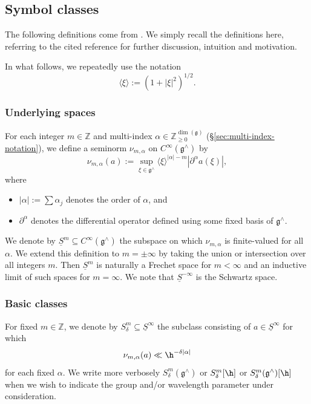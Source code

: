 \subsection{Symbol classes}
The following definitions come from \cite[\S9]{2020arXiv201202187N}.  We simply recall the definitions here, referring to the cited reference for further discussion, intuition and motivation.

In what follows, we repeatedly use the notation
\begin{equation*}
  \langle \xi \rangle := (1 + |\xi|^2)^{1/2}.
\end{equation*}

\subsubsection{Underlying spaces}
For each integer $m \in \mathbb{Z}$ and multi-index $\alpha \in \mathbb{Z}_{\geq 0}^{\dim(\mathfrak{g})}$ (\S\ref{sec:multi-index-notation}), we define a seminorm $\nu_{m,\alpha}$ on $C^\infty(\mathfrak{g}^\wedge)$ by
\[\nu_{m,\alpha}(a) := \sup_{\xi \in \mathfrak{g}^\wedge}
  \langle \xi \rangle^{|\alpha| - m} \left\lvert \partial^\alpha a(\xi) \right\rvert,
\]
where
\begin{itemize}
\item $|\alpha| := \sum \alpha_j$ denotes the order of $\alpha$, and
\item $\partial^\alpha$ denotes the differential operator defined using some fixed basis of $\mathfrak{g}^\wedge$.
\end{itemize}

We denote by  $\underline{S}^m \subseteq C^\infty(\mathfrak{g}^\wedge)$ the subspace on which $\nu_{m,\alpha}$ is finite-valued for all $\alpha$.  We extend this definition to $m = \pm \infty$ by taking the union or intersection over all integers $m$.  Then $\underline{S}^m$ is naturally a Frechet space for $m < \infty$ and an inductive limit of such spaces for $m = \infty$.  We note that $\underline{S}^{-\infty}$ is the Schwartz space.

\subsubsection{Basic classes}
For fixed $m \in \mathbb{Z}$, we denote by  $S^m_\delta \subseteq \underline{S}^{\infty}$ the subclass consisting of $a \in \underline{S}^\infty$ for which
\begin{equation*}
  \nu_{m,\alpha}(a) \ll \h^{-\delta |\alpha|}
\end{equation*}
for each fixed $\alpha$.  We write more verbosely $S_\delta^m(\mathfrak{g}^\wedge)$ or $S_\delta^m[\h]$ or $S_\delta^m(\mathfrak{g}^\wedge)[\h]$ when we wish to indicate the group and/or wavelength parameter under consideration.

